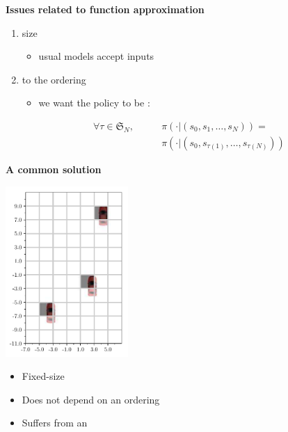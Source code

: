 \documentclass[a0paper,portrait,fontscale=0.3, margin=2cm]{baposter}
\begin{document}
\begin{poster}
{\textbf{Issues related to function approximation}

\begin{enumerate}
	\item {} size
    \begin{itemize}
		\item[\incarrow] usual models accept  inputs
	\end{itemize}

	\item {} to the ordering
	\begin{itemize}
		\item we want the policy to be :
	\end{itemize}
\begin{align*}
\forall\tau \in \mathfrak{S}_N, \qquad &\pi(\cdot|(s_0, s_1,\dotsc,s_N)) = \\ &\pi(\cdot|(s_0, s_{\tau(1)},\dotsc,s_{\tau(N)}))
\end{align*}
\end{enumerate}

\textbf{A common solution}
\begin{center}
	\includegraphics[width=0.35\textwidth]{../img/map}
\end{center}

\begin{itemize}[nolistsep]
	\item[\hlg{\checkmark}] Fixed-size
	\item[\hlg{\checkmark}] Does not depend on an ordering
	\item[\hlr{\xmark}] Suffers from an 
\end{itemize}

}


\end{poster}
\end{document}
